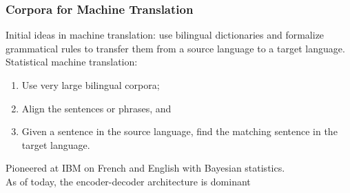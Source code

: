 \begin{frame}[fragile]
\frametitle{Corpora for Machine Translation}\color{structure}
Initial ideas in machine translation: use bilingual dictionaries and formalize grammatical rules to transfer them from a source language to a target language.\\
Statistical machine translation:
\begin{enumerate}\color{structure}
\item Use very large bilingual corpora;
\item Align the sentences or phrases, and
\item Given a sentence in the source language, find the matching sentence in the target language.
\end{enumerate} 
Pioneered at IBM on French and English with Bayesian statistics.\\
As of today, the encoder-decoder architecture is dominant
\end{frame}

